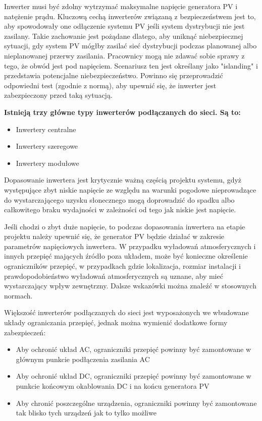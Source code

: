 \documentclass[12pt,a4paper]{article}
\begin{document}
Inwerter musi być zdolny wytrzymać maksymalne napięcie generatora PV i 
natężenie prądu. Kluczową cechą inwerterów związaną z bezpieczeństwem 
jest to, aby spowodowały one odłączenie systemu PV jeśli system 
dystrybucji nie jest zasilany. Takie zachowanie jest pożądane dlatego, 
aby uniknąć niebezpiecznej sytuacji, gdy system PV mógłby zasilać sieć 
dystrybucji podczas planowanej albo nieplanowanej przerwy zasilania. 
Pracownicy mogą nie zdawać sobie sprawy z tego, że obwód jest pod 
napięciem. Scenariusz ten jest określany jako "islanding" i 
przedstawia potencjalne niebezpieczeństwo. Powinno się przeprowadzić 
odpowiedni test (zgodnie z normą), aby upewnić się, że inwerter jest 
zabezpieczony przed taką sytuacją. 

 

\textbf{Istnieją trzy główne typy inwerterów podłączanych do sieci. Są 
to: }

\begin{itemize}
\item Inwertery centralne 
\item Inwertery szeregowe 
\item Inwertery modułowe 
\end{itemize}
Dopasowanie inwertera jest krytycznie ważną częścią projektu systemu, 
gdyż występujące zbyt niskie napięcie ze względu na warunki pogodowe 
nieprowadzące do wystarczającego uzysku słonecznego mogą doprowadzić do 
spadku albo całkowitego braku wydajności w zależności od tego jak niskie 
jest napięcie. 

Jeśli chodzi o zbyt duże napięcie, to podczas dopasowania inwertera na 
etapie projektu należy upewnić się, że generator PV będzie działać w 
zakresie parametrów napięciowych inwertera. W przypadku wyładowań 
atmosferycznych i innych przepięć mających źródło poza układem, może być 
konieczne określenie ograniczników przepięć, w przypadkach gdzie 
lokalizacja, rozmiar instalacji i prawdopodobieństwo wyładowań 
atmosferycznych są uznane, aby mieć wystarczający wpływ zewnętrzny. 
Dalsze wskazówki można znaleźć w stosownych normach. 

 

Większość inwerterów podłączanych do sieci jest wyposażonych we 
wbudowane układy ograniczania przepięć, jednak można wymienić dodatkowe 
formy zabezpieczeń: 

\begin{itemize}
\item Aby ochronić układ AC, ograniczniki przepięć powinny być 
zamontowane w głównym punkcie podłączenia zasilania AC 
\item Aby ochronić układ DC, ograniczniki przepięć powinny być 
zamontowane w punkcie końcowym okablowania DC i na końcu generatora PV 
\item Aby chronić poszczególne urządzenia, ograniczniki powinny być 
zamontowane tak blisko tych urządzeń jak to tylko możliwe 
\end{itemize}
\end{document}
